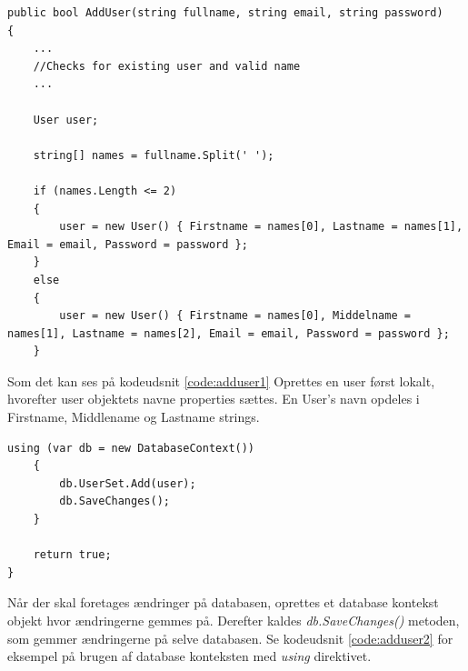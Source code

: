 \begin{lstlisting}[caption=User laves lokalt hvorefter User's navne properties sættes, label=code:adduser1]
public bool AddUser(string fullname, string email, string password)
{
	...
	//Checks for existing user and valid name
	...
	
	User user;

	string[] names = fullname.Split(' ');

	if (names.Length <= 2)
	{
		user = new User() { Firstname = names[0], Lastname = names[1], Email = email, Password = password };
	}
	else
	{
		user = new User() { Firstname = names[0], Middelname = names[1], Lastname = names[2], Email = email, Password = password };
	}
\end{lstlisting}

Som det kan ses på kodeudsnit \ref{code:adduser1} Oprettes en user først lokalt, hvorefter user objektets navne properties sættes. En User's navn opdeles i Firstname, Middlename og Lastname strings. 

\begin{lstlisting}[caption=User objektet tilføjes i database konteksten hvorefter der gemmes på selve databasen,label=adduser2]
	using (var db = new DatabaseContext())
	{
		db.UserSet.Add(user);
		db.SaveChanges();
	}

	return true;
}
\end{lstlisting}

Når der skal foretages ændringer på databasen, oprettes et database kontekst objekt hvor ændringerne gemmes på. Derefter kaldes \textit{db.SaveChanges()} metoden, som gemmer ændringerne på selve databasen. Se kodeudsnit \ref{code:adduser2} for eksempel på brugen af database konteksten med \textit{using} direktivet.

